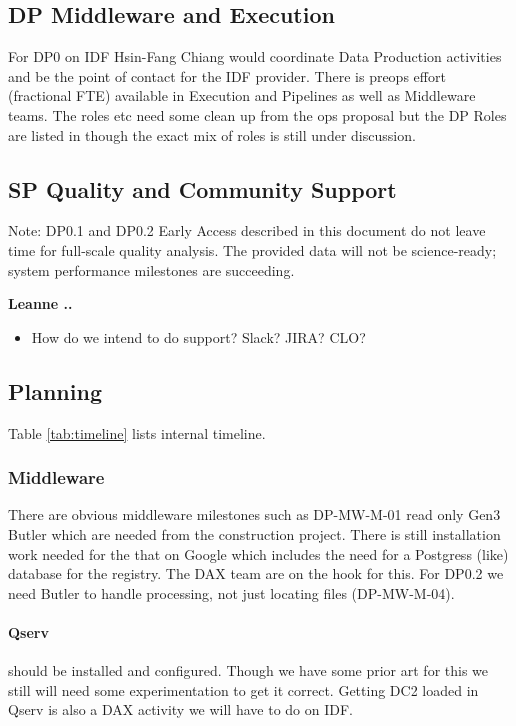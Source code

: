\subsection{DP Middleware and Execution}\label{sec:dp}
For DP0 on IDF Hsin-Fang Chiang would coordinate Data Production activities and be the point
of contact for the IDF provider.
There is preops effort (fractional FTE) available in Execution and Pipelines as well as Middleware teams.
The roles etc need some clean up from the ops proposal but the DP Roles are listed in  though the exact mix of roles is still under discussion.


\subsection{SP Quality  and Community Support} \label{sec:sp}

Note: DP0.1 and DP0.2 Early Access described in this document do not leave time for full-scale quality analysis. The provided data will not be science-ready; system performance milestones are succeeding.

{\bf Leanne .. }

\begin{itemize}
\item How do we intend to do support? Slack? JIRA? CLO?
\end{itemize}


\subsection{Planning}



Table \ref{tab:timeline} lists internal timeline.

\subsubsection{Middleware}
There are obvious middleware milestones such as DP-MW-M-01 read only Gen3 Butler which are needed from the construction project.
There is still installation work needed for the that on Google which includes the need for a Postgress (like) database for the registry. The DAX team are on the hook for this.
For DP0.2 we need Butler to handle processing, not just locating files (DP-MW-M-04).

\paragraph{Qserv} should be installed  and configured. Though we have some prior art for this we
still will need some experimentation to get it correct. Getting DC2 loaded in Qserv is also a DAX activity
we will have to do on IDF.

